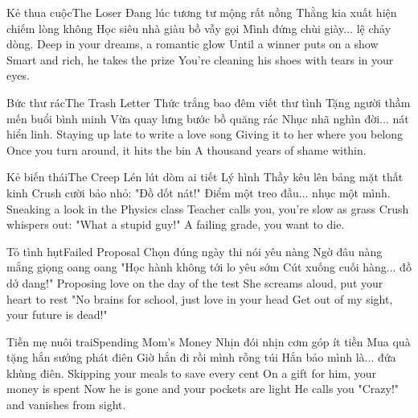 \begin{tutuyetbox}{Kẻ thua cuộc}{The Loser}
Đang lúc tương tư mộng rất nồng
Thằng kia xuất hiện chiếm lòng không
Học siêu nhà giàu bồ vẫy gọi
Mình đứng chùi giày... lệ chảy dòng.
\tcblower
Deep in your dreams, a romantic glow
Until a winner puts on a show
Smart and rich, he takes the prize
You're cleaning his shoes with tears in your eyes.
\end{tutuyetbox}

\begin{tutuyetbox}{Bức thư rác}{The Trash Letter}
Thức trắng bao đêm viết thư tình
Tặng người thầm mến buổi bình minh
Vừa quay lưng bước bồ quăng rác
Nhục nhã nghìn đời... nát hiển linh.
\tcblower
Staying up late to write a love song
Giving it to her where you belong
Once you turn around, it hits the bin
A thousand years of shame within.
\end{tutuyetbox}

\begin{tutuyetbox}{Kẻ biến thái}{The Creep}
Lén lút dòm ai tiết Lý hình
Thầy kêu lên bảng mặt thất kinh
Crush cười bảo nhỏ: "Đồ dốt nát!"
Điểm một treo đầu... nhục một mình.
\tcblower
Sneaking a look in the Physics class
Teacher calls you, you're slow as grass
Crush whispers out: "What a stupid guy!"
A failing grade, you want to die.
\end{tutuyetbox}

\begin{tutuyetbox}{Tỏ tình hụt}{Failed Proposal}
Chọn đúng ngày thi nói yêu nàng
Ngờ đâu nàng mắng giọng oang oang
"Học hành không tới lo yêu sớm
Cút xuống cuối hàng... đồ dở dang!"
\tcblower
Proposing love on the day of the test
She screams aloud, put your heart to rest
"No brains for school, just love in your head
Get out of my sight, your future is dead!"
\end{tutuyetbox}

\begin{tutuyetbox}{Tiền mẹ nuôi trai}{Spending Mom's Money}
Nhịn đói nhịn cơm góp ít tiền
Mua quà tặng hắn sướng phát điên
Giờ hắn đi rồi mình rỗng túi
Hắn bảo mình là... đứa khùng điên.
\tcblower
Skipping your meals to save every cent
On a gift for him, your money is spent
Now he is gone and your pockets are light
He calls you "Crazy!" and vanishes from sight.
\end{tutuyetbox}

